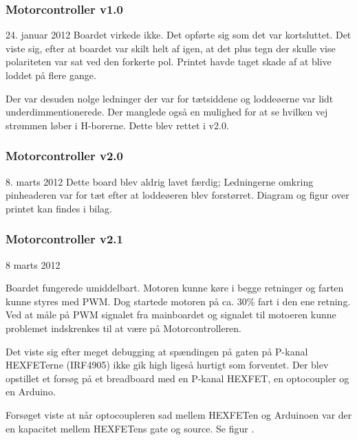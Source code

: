 \documentclass[a4paper,oneside,article,danish,table,draft]{memoir}
\newcommand{\boarddate}[1]{\textcolor{blue!80!black}{#1}}
\begin{document}
\subsubsection{Motorcontroller v1.0}
\boarddate{24. januar 2012}
Boardet virkede ikke. Det opførte sig som det var kortsluttet. Det viste sig, efter at boardet var skilt helt af igen, at det plus tegn der skulle vise polariteten var sat ved den forkerte pol. Printet havde taget skade af at blive loddet på flere gange.

Der var desuden nolge ledninger der var for tætsiddene og loddeøerne var lidt underdimmentionerede. Der manglede også en mulighed for at se hvilken vej strømmen løber i H-borerne. Dette blev rettet i v2.0.
\subsubsection{Motorcontroller v2.0}
\boarddate{8. marts 2012} Dette board blev aldrig lavet færdig; Ledningerne omkring pinheaderen var for tæt efter at loddeøeren blev forstørret. Diagram og figur over printet kan findes i bilag. 

\subsubsection{Motorcontroller v2.1}
\boarddate{8 marts 2012}


Boardet fungerede umiddelbart. Motoren kunne køre i begge retninger og farten kunne styres med PWM. Dog startede motoren på ca. 30\% fart i den ene retning. Ved at måle på PWM signalet fra mainboardet og signalet til motoeren kunne problemet indskrenkes til at være på Motorcontrolleren.

Det viste sig efter meget debugging at spændingen på gaten på P-kanal HEXFETerne (IRF4905) ikke gik high ligeså hurtigt som forventet. Der blev opstillet et forsøg på et breadboard med en P-kanal HEXFET, en optocoupler og en Arduino.


Forsøget viste at når optocoupleren sad mellem HEXFETen og Arduinoen var der en kapacitet mellem HEXFETens gate og source. Se figur .
\end{document}
